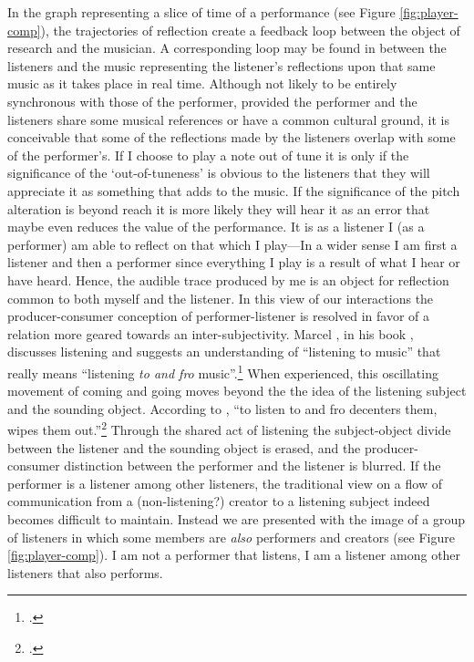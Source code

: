 In the graph representing a slice of time of a performance (see Figure \ref{fig:player-comp}), the trajectories of reflection create a feedback loop between the object of research and the musician. A corresponding loop may be found in between the listeners and the music representing the listener's reflections upon that same music as it takes place in real time. Although not likely to be entirely synchronous with those of the performer, provided the performer and the listeners share some musical references or have a common cultural ground, it is conceivable that some of the reflections made by the listeners overlap with some of the performer's. If I choose to play a note out of tune it is only if the significance of the `out-of-tuneness' is obvious to the listeners that they will appreciate it as something that adds to the music. If the significance of the pitch alteration is beyond reach it is more likely they will hear it as an error that maybe even reduces the value of the performance. It is as a listener I (as a performer) am able to reflect on that which I play---In a wider sense I am first a listener and then a performer since everything I play is a result of what I hear or have heard. Hence, the audible trace produced by me is an object for reflection common to both myself and the listener. In this view of our interactions the producer-consumer conception of performer-listener is resolved in favor of a relation more geared towards an  inter-subjectivity. Marcel \citeauthor{cobussen08}, in his book , discusses listening and suggests an understanding of ``listening to music'' that really means ``listening \emph{to and fro} music''.\footcite[p. 135 (italics by the author)]{cobussen08} When experienced, this oscillating movement of coming and going moves beyond the the idea of the listening subject and the sounding object. According to \citeauthor{cobussen08}, ``to listen to and fro decenters them, wipes them out.''\footcite[135]{cobussen08} Through the shared act of listening the subject-object divide between the listener and the sounding object is erased, and the producer-consumer distinction between the performer and the listener is blurred. 
If the performer is a listener among other listeners, the traditional view on a flow of communication from a (non-listening?) creator to a listening subject indeed becomes difficult to maintain. Instead we are presented with the image of a group of listeners in which some members are \emph{also} performers and creators (see Figure \ref{fig:player-comp}). I am not a performer that listens, I am a listener among other listeners that also performs. 


